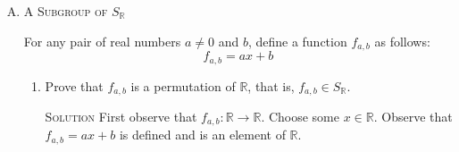 \documentclass[twoside]{amsart}
\newcommand{\Reals}{\ensuremath{\mathbb{R}}\xspace}
\newcommand{\Integers}{\ensuremath{\mathbb{Z}{}}\xspace}
\newcommand{\solution}{\textsc{Solution}\xspace}
\begin{document}
\begin{enumerate}[A.]
\begin{enumerate}[1]
      $G$ is closed with respect to $\circ$.
      \begin{proof}
      By part 2 we know that $f_n \circ f_m = f_{n+m}$ and $n+m \in \Integers$.
      \end{proof}

      $G$ is closed with respect to inverses.
      \begin{proof}
      By part 2 we know that $f_n^{-1} = f_{-n}$ and we know $-n \in \Integers$.
      \end{proof}

      We also know by part 1 that $f_n : \Reals \to \Reals$. Therefore 
      $G$ is a subgroup of $S_{\mathbb{R}}$.

      \vspace{5pt}
      \item Prove that $G$ is cyclic. (Indicate a generator of $G$.)
      
      \solution $G$ is $\langle f_1 \rangle$
      \begin{proof}
      We must show that for any element $m \in \Integers$ we can 
      generate $f_m$ from $f_1$. Let $m$ be greater than 0. Then we can
      generate $f_m$ by
      \[
         f_m = \underbrace{f_1 \circ f_1 \circ f_1 \cdots f_1 \circ f_1}_{
	          m \text{ factors}} 
      \]

      Next let $m$ be less than 0. Then we can generate it by
      \[
         f_m = \underbrace{f_{-1} \circ f_{-1} \cdots f_{-1}}_{
	          |m| \text{ factors}}
      \]

      Finally, let m = 0. Then $f_0 = f_1 \circ f_{-1} = \epsilon$.
      We have now shown how to generate all the elements in 
      $\{f_n : n \in Integers\}$ using $f_1$.
      \end{proof}


   \end{enumerate}

   \item \textsc{A Subgroup of} $S_\mathbb{R}$

   \noindent For any pair of real numbers $a \ne 0$ and $b$, define a function
   $f_{a,b}$ as follows:
   \[
      f_{a,b} = ax + b
   \]

   \begin{enumerate}[1]
      \item Prove that $f_{a,b}$ is a permutation of \Reals, that is,
      $f_{a,b} \in S_\mathbb{R}$.

      \solution First observe that $f_{a,b} : \Reals \to \Reals$. 
      Choose some $x \in \Reals$. Observe that $f_{a,b} = ax + b$
      is defined and is an element of \Reals. 


\end{enumerate}
\end{enumerate}
\end{document}
